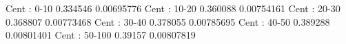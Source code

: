 Cent : 0-10
0.334546 0.00695776
Cent : 10-20
0.360088 0.00754161
Cent : 20-30
0.368807 0.00773468
Cent : 30-40
0.378055 0.00785695
Cent : 40-50
0.389288 0.00801401
Cent : 50-100
0.39157 0.00807819
